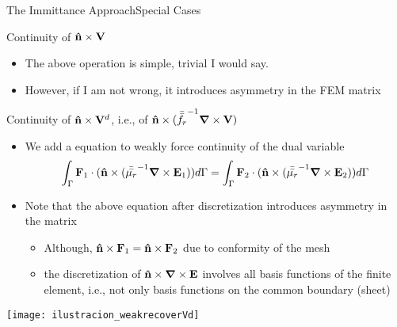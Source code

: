 \begin{frame}[allowframebreaks]{The Immittance Approach}{Special Cases}
\begin{block}{Continuity of  $\mathbf{\hat{n}}\times\mathbf{V}$}
\begin{itemize}
    \item The above operation is simple, trivial I would say.

    \item However, \alert{if I am not wrong}, it introduces asymmetry
      in the FEM matrix
      
    \end{itemize}
  \end{block}
  
  \framebreak  %

  \begin{block}{Continuity of $\mathbf{\hat{n}}\times\mathbf{V}^d$, i.e., of
      $\mathbf{\hat{n}}\times( {\bar{\bar{f_r}}}^{-1} \boldsymbol{\nabla} \times\mathbf{V})$}
    \begin{itemize}
    \item We add a equation to weakly force continuity of the dual variable
      \begin{equation}
        \label{eq:weakrecoverVd}
        \int_{\Gamma} \mathbf{F}_1\cdot(\mathbf{\hat{n}} \times ( {\bar{\bar{\mu_r}}}^{-1} \boldsymbol{\nabla} \times \mathbf{E}_1 )) d\Gamma = 
        \int_{\Gamma} \mathbf{F}_2\cdot(\mathbf{\hat{n}} \times ( {\bar{\bar{\mu_r}}}^{-1} \boldsymbol{\nabla} \times \mathbf{E}_2 )) d\Gamma 
      \end{equation}

    \item Note that the above equation after discretization introduces
      asymmetry in the matrix
      \begin{itemize}
      \item Although, $\mathbf{\hat{n}}\times\mathbf{F}_1=\mathbf{\hat{n}}\times\mathbf{F}_2$ due to
        conformity of the mesh
      \item the discretization of
        $\mathbf{\hat{n}} \times \boldsymbol{\nabla}\times\mathbf{E}$ involves all basis
        functions of the finite element, i.e., not only basis
        functions on the common boundary (sheet)
      \end{itemize}

      
    \end{itemize}
  \end{block}

  \framebreak  %

  \begin{center}
    \texttt{[image: ilustracion\_weakrecoverVd]}
  \end{center}
  
  \framebreak  %
  

\end{frame}
